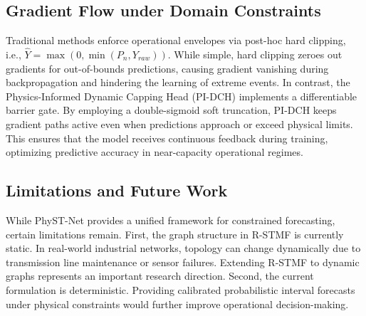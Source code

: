 \subsection{Gradient Flow under Domain Constraints}
Traditional methods enforce operational envelopes via post-hoc hard clipping, i.e., $\hat{Y} = \max(0, \min(P_n, Y_{raw}))$. While simple, hard clipping zeroes out gradients for out-of-bounds predictions, causing gradient vanishing during backpropagation and hindering the learning of extreme events. In contrast, the Physics-Informed Dynamic Capping Head (PI-DCH) implements a differentiable barrier gate. By employing a double-sigmoid soft truncation, PI-DCH keeps gradient paths active even when predictions approach or exceed physical limits. This ensures that the model receives continuous feedback during training, optimizing predictive accuracy in near-capacity operational regimes.

\subsection{Limitations and Future Work}
While PhyST-Net provides a unified framework for constrained forecasting, certain limitations remain. First, the graph structure in R-STMF is currently static. In real-world industrial networks, topology can change dynamically due to transmission line maintenance or sensor failures. Extending R-STMF to dynamic graphs represents an important research direction. Second, the current formulation is deterministic. Providing calibrated probabilistic interval forecasts under physical constraints would further improve operational decision-making.
